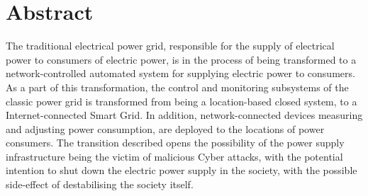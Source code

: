 \chapter*{Abstract}



The traditional electrical power grid, responsible for the supply of electrical power to consumers of electric power, is in the process of being transformed to a network-controlled automated system for supplying electric power to consumers.
As a part of this transformation, the control and monitoring subsystems of the classic power grid is transformed from being a location-based closed system, to a Internet-connected Smart Grid. In addition, network-connected devices measuring and adjusting power consumption, are deployed to the locations of power consumers.
The transition described opens the possibility of the power supply infrastructure  being the victim of malicious Cyber attacks, with the potential intention to shut down  the electric power supply in the society, with the possible side-effect of destabilising the society itself.

